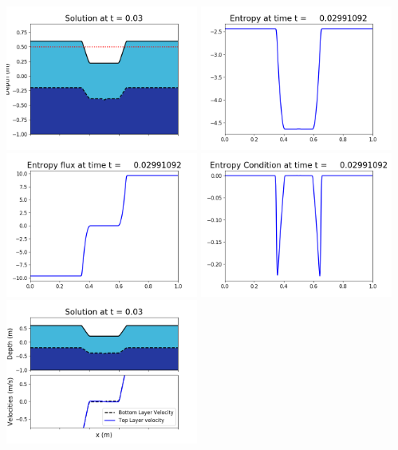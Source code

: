 \documentclass[11pt]{article}
\begin{document}
\includegraphics[width=0.475\textwidth]{frame0083fig1006.png}
\vskip 10pt 
\includegraphics[width=0.475\textwidth]{frame0083fig1007.png}
\includegraphics[width=0.475\textwidth]{frame0083fig1008.png}
\vskip 10pt 
\includegraphics[width=0.475\textwidth]{frame0083fig1009.png}
\vskip 10pt 
\includegraphics[width=0.475\textwidth]{frame0084fig1001.png}
\end{document}
